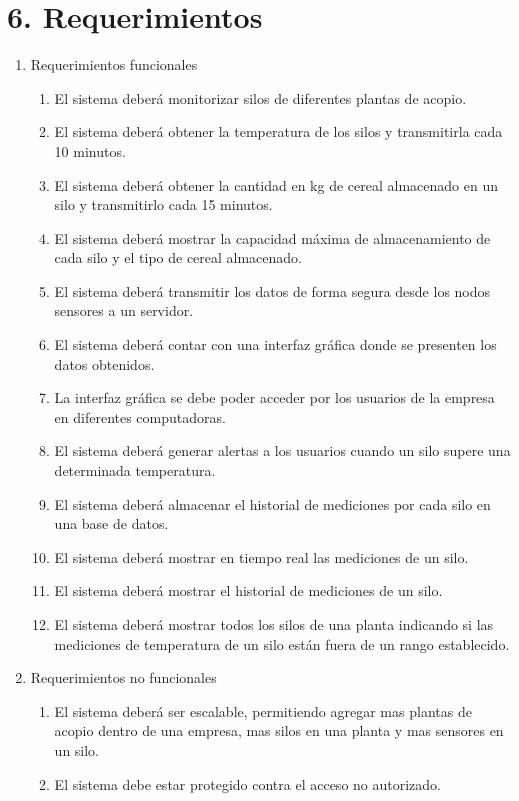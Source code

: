 \documentclass[
11pt, %
]{charter}
\begin{document}
\section{6. Requerimientos}
\label{sec:requerimientos}

\begin{enumerate}
	\item Requerimientos funcionales
		\begin{enumerate}
			\item El sistema deberá monitorizar silos de diferentes plantas de acopio.
			\item El sistema deberá obtener la temperatura de los silos y transmitirla cada 10 minutos.
			\item El sistema deberá obtener la cantidad en kg de cereal almacenado en un silo y transmitirlo cada 15 minutos.
			\item El sistema deberá mostrar la capacidad máxima de almacenamiento de cada silo y el tipo de cereal almacenado.
			\item El sistema deberá transmitir los datos de forma segura desde los nodos sensores a un servidor. 
			\item El sistema deberá contar con una interfaz gráfica donde se presenten los datos obtenidos.
			\item La interfaz gráfica se debe poder acceder por los usuarios de la empresa en diferentes computadoras.
			\item El sistema deberá generar alertas a los usuarios cuando un silo supere una determinada temperatura. 
			\item El sistema deberá almacenar el historial de mediciones por cada silo en una base de datos. 
			\item El sistema deberá mostrar en tiempo real las mediciones de un silo. 
			\item El sistema deberá mostrar el historial de mediciones de un silo.
			\item El sistema deberá mostrar todos los silos de una planta indicando si las mediciones de temperatura de un silo están fuera de un rango establecido. 
		\end{enumerate}
	\item Requerimientos no funcionales
		\begin{enumerate}
			\item El sistema deberá ser escalable, permitiendo agregar mas plantas de acopio dentro de una empresa, mas silos en una planta y mas sensores en un silo.  
			\item El sistema debe estar protegido contra el acceso no autorizado.

\end{enumerate}
\end{enumerate}
\end{document}
